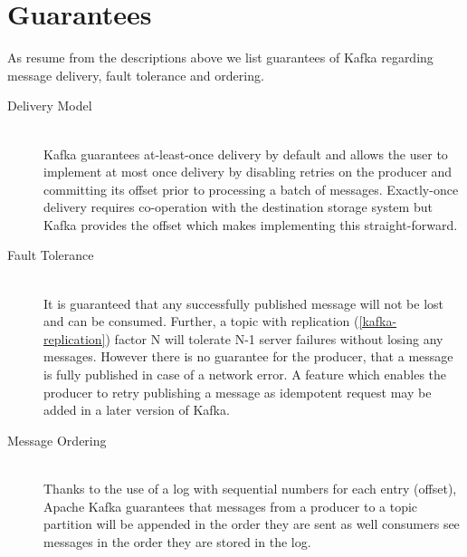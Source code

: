 \section{Guarantees}
\label{kafka-guarantees}
As resume from the descriptions above we list guarantees of Kafka regarding
message delivery, fault tolerance and ordering. 

\begin{description}

\item[Delivery Model] \hfill \\
    Kafka guarantees at-least-once delivery by default and allows the user to
    implement at most once delivery by disabling retries on the producer and
    committing its offset prior to processing a batch of messages. Exactly-once
    delivery requires co-operation with the destination storage system but Kafka
    provides the offset which makes implementing this
    straight-forward.\cite{apachekafka}

\item[Fault Tolerance] \hfill \\
    It is guaranteed that any successfully published message will not be lost
    and can be consumed. Further, a topic with replication
    (\ref{kafka-replication}) factor N will tolerate N-1 server failures without
    losing any messages. However there is no guarantee for the producer, that
    a message is fully published in case of a network error. A feature which
    enables the producer to retry publishing a message as idempotent
     request may be added in a later version of Kafka. \cite{apachekafka}

\item[Message Ordering] \hfill \\
    Thanks to the use of a log with sequential numbers for each entry (offset),
    Apache Kafka guarantees that messages from a producer to a topic partition
    will be appended in the order they are sent as well consumers see messages
    in the order they are stored in the log. \cite{apachekafka}

\end{description}

